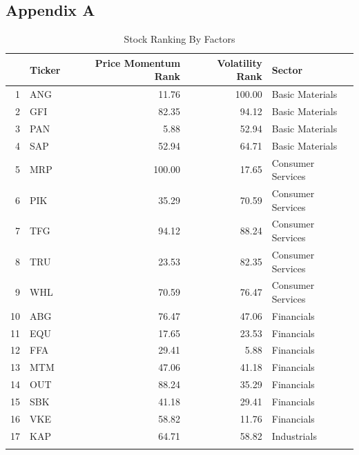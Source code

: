 \documentclass[11pt,preprint, authoryear]{elsarticle}
\numberwithin{equation}{section}
\numberwithin{figure}{section}
\numberwithin{table}{section}
\begin{document}
\hypertarget{appendix-a}{%
\subsection{\texorpdfstring{Appendix
A\label{app1}}{Appendix A}}\label{appendix-a}}

\begin{longtable}{rlrrl}
  \hline
 & Ticker & Price Momentum Rank & Volatility  Rank & Sector \\ 
  \hline
1 & ANG & 11.76 & 100.00 & Basic Materials \\ 
  2 & GFI & 82.35 & 94.12 & Basic Materials \\ 
  3 & PAN & 5.88 & 52.94 & Basic Materials \\ 
  4 & SAP & 52.94 & 64.71 & Basic Materials \\ 
  5 & MRP & 100.00 & 17.65 & Consumer Services \\ 
  6 & PIK & 35.29 & 70.59 & Consumer Services \\ 
  7 & TFG & 94.12 & 88.24 & Consumer Services \\ 
  8 & TRU & 23.53 & 82.35 & Consumer Services \\ 
  9 & WHL & 70.59 & 76.47 & Consumer Services \\ 
  10 & ABG & 76.47 & 47.06 & Financials \\ 
  11 & EQU & 17.65 & 23.53 & Financials \\ 
  12 & FFA & 29.41 & 5.88 & Financials \\ 
  13 & MTM & 47.06 & 41.18 & Financials \\ 
  14 & OUT & 88.24 & 35.29 & Financials \\ 
  15 & SBK & 41.18 & 29.41 & Financials \\ 
  16 & VKE & 58.82 & 11.76 & Financials \\ 
  17 & KAP & 64.71 & 58.82 & Industrials \\ 
   \hline
\hline
\caption{Stock Ranking By Factors \label{tab1}} 
\end{longtable}
\end{document}
